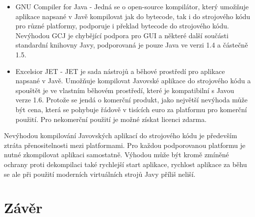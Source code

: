 \begin{itemize}
  \item GNU Compiler for Java\cite{gcj} - Jedná se o open-source kompilátor,
  který umožňuje aplikace napsané v Javě kompilovat jak do bytecode, tak i do
  strojového kódu pro různé platformy, podporuje i překlad bytecode do
  strojového kódu. Nevýhodou GCJ je chybějící podpora pro \gls{GUI} a některé
  další součásti standardní knihovny Javy, podporovaná je pouze Java ve
  verzi 1.4 a částečně 1.5.
  \item Excelsior JET\cite{jet} - JET je sada nástrojů a běhové prostředí pro
  aplikace napsané v Javě. Umožňuje kompilovat Javovské aplikace do strojového
  kódu a spouštět je ve vlastním běhovém prostředí, které je kompatibilní s
  Javou verze 1.6. Protože se jendá o komerční produkt, jako největší nevýhoda
  může být cena, která se pohybuje řádově v tisících euro za platformu pro
  komerční použití. Pro nekomerční použití je možné získat licenci zdarma.
\end{itemize}

Nevýhodou kompilování Javovských aplikací do strojového kódu je především ztráta
přenositelnosti mezi platformami. Pro každou podporovanou platformu je nutné
zkompilovat aplikaci samostatně. Výhodou může být kromě zmíněné ochrany proti
dekompilaci také rychlejší start aplikace, rychlost aplikace za běhu se ale při
použití moderních virtuálních strojů Javy příliš neliší.

\section{Závěr}


